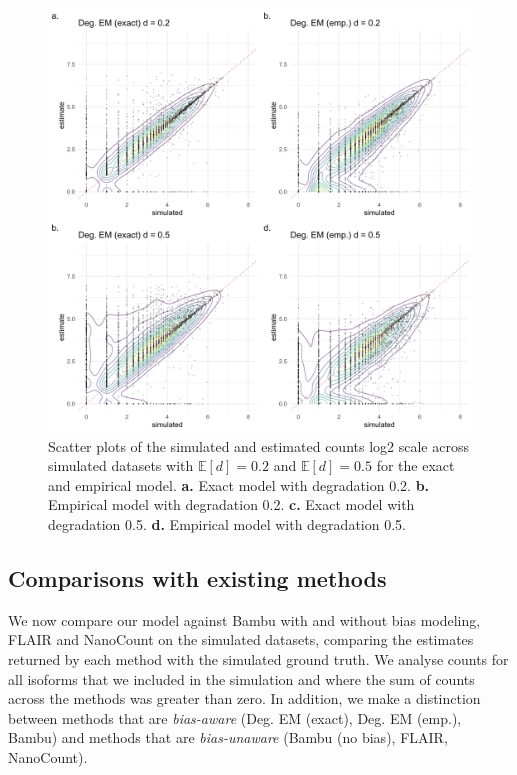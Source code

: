 \begin{figure}[H]
    \centering
    \includegraphics[width=\textwidth]{figures/sec-4-1-scatter-hard.png}
    \caption[Scatter plots across simulated datasets for model variations]{Scatter plots of the simulated and estimated counts log2 scale across simulated datasets with $\mathbb{E}[d]=0.2$ and $\mathbb{E}[d]=0.5$ for the exact and empirical model. \textbf{a.} Exact model with degradation 0.2. \textbf{b.} Empirical model with degradation 0.2. \textbf{c.} Exact model with degradation 0.5. \textbf{d.} Empirical model with degradation 0.5.}
    \label{fig:4-1-scatter}
\end{figure}

\subsection{Comparisons with existing methods}

We now compare our model against Bambu with and without bias modeling, FLAIR and NanoCount on the simulated datasets, comparing the estimates returned by each method with the simulated ground truth. We analyse counts for all isoforms that we included in the simulation and where the sum of counts across the methods was greater than zero. In addition, we make a distinction between methods that are \textit{bias-aware} (Deg. EM (exact), Deg. EM (emp.), Bambu) and methods that are \textit{bias-unaware} (Bambu (no bias), FLAIR, NanoCount). 

